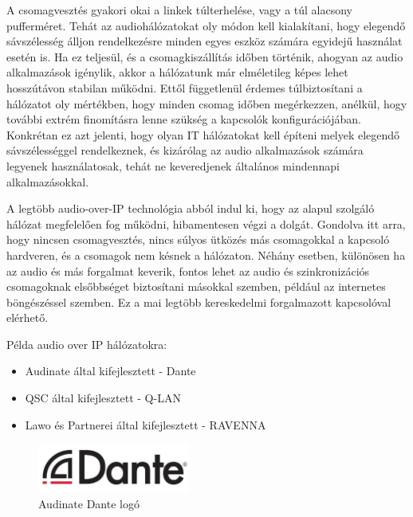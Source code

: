 A csomagvesztés gyakori okai a linkek túlterhelése, vagy a túl alacsony pufferméret.
Tehát az audiohálózatokat oly módon kell kialakítani, hogy elegendő sávszélesség álljon rendelkezésre
minden egyes eszköz számára egyidejű használat esetén is. 
Ha ez teljesül, és a csomagkiszállítás időben történik, ahogyan az audio alkalmazások igénylik,
akkor a hálózatunk már elméletileg képes lehet hosszútávon stabilan működni.
Ettől függetlenül érdemes túlbiztosítani a hálózatot oly mértékben, hogy minden csomag időben
megérkezzen, anélkül, hogy további extrém finomításra lenne szükség a kapcsolók
konfigurációjában. Konkrétan ez azt jelenti, hogy olyan IT hálózatokat kell
építeni melyek elegendő sávszélességgel rendelkeznek, és kizárólag az audio alkalmazások számára
legyenek használatosak, tehát ne keveredjenek általános mindennapi alkalmazásokkal.

A legtöbb audio-over-IP technológia abból indul ki, hogy az alapul szolgáló
hálózat megfelelően fog működni, hibamentesen végzi a dolgát. Gondolva itt arra, hogy nincsen csomagvesztés, 
nincs súlyos ütközés más csomagokkal a kapcsoló hardveren, és a csomagok nem késnek a hálózaton.
Néhány esetben, különösen ha az audio és más forgalmat keverik, 
fontos lehet az audio és szinkronizációs csomagoknak elsőbbséget biztosítani másokkal szemben,
például az internetes böngészéssel szemben. Ez a mai legtöbb kereskedelmi forgalmazott
kapcsolóval elérhető. \newline

Példa audio over IP hálózatokra:
\begin{itemize}
	\item Audinate által kifejlesztett - Dante
\end{itemize}
\begin{itemize}
	\item QSC által kifejlesztett - Q-LAN
\end{itemize}
\begin{itemize}
	\item Lawo és Partnerei által kifejlesztett - RAVENNA
\end{itemize}
\begin{figure}[H]
	\centering
	\includegraphics[width=50mm, keepaspectratio]{figures/dante_logo.jpg}
	\caption{Audinate Dante logó}
	\label {fig:dante_logo}
\end{figure}
